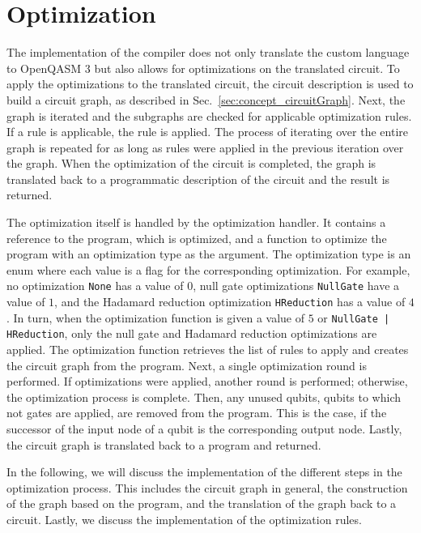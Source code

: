 \section{Optimization}
The implementation of the compiler does not only translate the custom language to OpenQASM 3 but
also allows for optimizations on the translated circuit. 
To apply the optimizations to the translated circuit, the circuit description is used to build a circuit graph, as described in Sec.~\ref{sec:concept_circuitGraph}. Next, the graph is iterated and the subgraphs are checked for applicable optimization rules. If a rule is applicable, the rule is applied. The process of iterating over the entire graph is repeated for as long as rules were applied in the previous iteration over the graph. When the optimization of the circuit is completed, the graph is translated back to a programmatic description of the circuit and the result is returned.

The optimization itself is handled by the optimization handler. It contains a reference to the program, which is optimized, and a function to optimize the program with an optimization type as the argument. The optimization type is an enum where each value is a flag for the corresponding optimization. For example, no optimization \texttt{None} has a value of $0$, null gate optimizations \texttt{NullGate} have a value of $1$, and the Hadamard reduction optimization \texttt{HReduction} has a value of $4$. In turn, when the optimization function is given a value of $5$ or \texttt{NullGate | HReduction}, only the null gate and Hadamard reduction optimizations are applied. The optimization function retrieves the list of rules to apply and creates the circuit graph from the program. Next, a single optimization round is performed. If optimizations were applied, another round is performed; otherwise, the optimization process is complete. Then, any unused qubits, \ie qubits to which not gates are applied, are removed from the program. This is the case, if the successor of the input node of a qubit is the corresponding output node. Lastly, the circuit graph is translated back to a program and returned.

In the following, we will discuss the implementation of the different steps in the optimization process. This includes the circuit graph in general, the construction of the graph based on the program, and the translation of the graph back to a circuit. Lastly, we discuss the implementation of the optimization rules.

